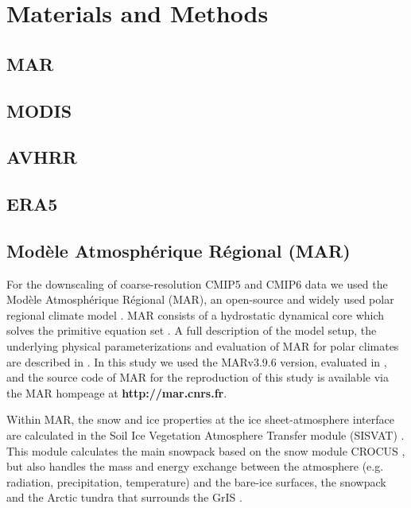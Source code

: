 \documentclass[12pt]{article}
\begin{document}
\cleardoublepage
\printbibliography[title={Main References}]

\baselineskip24pt
\section*{Materials and Methods}

\subsection*{MAR}

%
\subsection*{MODIS}

\subsection*{AVHRR}

\subsection*{ERA5}


\subsection*{Modèle Atmosphérique Régional (MAR)}
For the downscaling of coarse-resolution CMIP5 and CMIP6 data we used the Modèle Atmosphérique Régional (MAR), an open-source and widely used polar regional climate model
\cite{Fettweis2007,Fettweis2013,Fettweis2017,Gallee1994,Gallee1995,Hofer2017,Hofer2019,Kittel2018, Delhasse2018,Lang2015, Agosta2019}. MAR consists of a hydrostatic dynamical core which solves the primitive equation set \cite{Gallee1994,Gallee1995}. A full description of the model setup, the underlying physical parameterizations and evaluation of MAR for polar climates are described in \cite{Gallee1994,Gallee1995,Fettweis2007,Fettweis2017,Hofer2017,Hofer2019,Kittel2018,Agosta2019}. In this study we used the MARv3.9.6 version, evaluated in \textcite{Delhasse2019}, and the source code of MAR for the reproduction of this study is available via the MAR hompeage at \textbf{http://mar.cnrs.fr}.

Within MAR, the snow and ice properties at the ice sheet-atmosphere interface are calculated in the Soil Ice Vegetation Atmosphere Transfer module (SISVAT) \cite{Gallee1994}. This module calculates the main snowpack based on the snow module CROCUS \cite{Gallee2001,Vionnet2012}, but also handles the mass and energy exchange between the atmosphere (e.g. radiation, precipitation, temperature) and the bare-ice surfaces, the snowpack and the Arctic tundra that surrounds the GrIS \cite{Gallee1994,Fettweis2007}.
\end{document}

